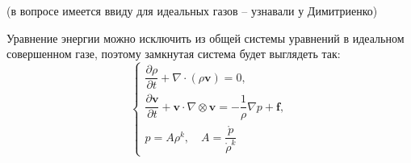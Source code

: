 
(в вопросе имеется ввиду для идеальных газов -- узнавали у Димитриенко)

Уравнение энергии можно исключить из общей системы уравнений в идеальном совершенном газе,
поэтому замкнутая система будет выглядеть так:
\[
  \begin{cases}
    \dfrac{\partial \rho}{\partial t} + \nabla \cdot (\rho \mathbf{v}) = 0, \\
    \dfrac{\partial \mathbf{v}}{\partial t} + \mathbf{v} \cdot \nabla \otimes \mathbf{v} = - \dfrac{1}{\rho} \nabla p + \mathbf{f}, \\
    p = A \rho^k, \quad A = \dfrac{\mathring{p}}{\mathring{\rho}^k}
  \end{cases}
\]
